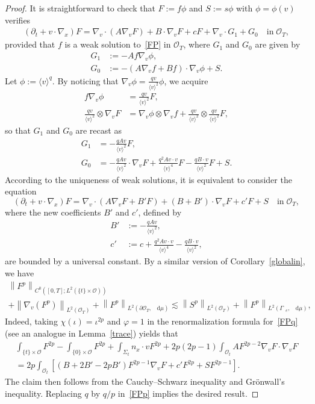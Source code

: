\documentclass[10pt]{amsart}
\theoremstyle{definition}\newtheorem{defi}[theo]{Definition}\newtheorem{rema}[theo]{Remark}\newtheorem{exam}[theo]{Example}\newtheorem{exem}[theo]{Example}\newtheorem{nota}[theo]{Notation}
\newcommand*{\dif}{\mathop{}\!\mathrm{d}}
\newcommand*\p{\partial}
\newcommand*\Ge {\Gamma_{\;\!\!\;\!\!e}}
\newcommand*\OO {\mathcal{O}}
\newcommand{\lv}{\langle v\rangle}
\begin{document}
\begin{proof}
It is straightforward to check that $F:=f\phi$ and $S:=s\phi$ with $\phi=\phi(v)$ verifies
\begin{align*}
\left(\p_t+v\cdot\nabla_x\right)F = \nabla_v\cdot\left(A\nabla_vF\right) +B\cdot\nabla_v F +cF +\nabla_v\cdot G_1 + G_0 \quad\text{in}\;\OO_T,
\end{align*}
provided that $f$ is a weak solution to~\eqref{FP} in $\OO_T$, where $G_1$ and $G_0$ are given by
\begin{align*}
G_1&:= -Af\nabla_v\phi,\\
G_0&:= -\left(A\nabla_vf+Bf\right)\cdot\nabla_v\phi +S.
\end{align*}
Let $\phi:=\lv^q$. By noticing that $\nabla_v\phi=\frac{qv}{\lv^2}\phi$, we acquire
\begin{align*}
f\nabla_v\phi &=\frac{qv}{\lv^2}F,\\
\frac{qv}{\lv^2}\otimes\nabla_vF &=\nabla_v\phi\otimes\nabla_vf+\frac{qv}{\lv^2}\otimes \frac{qv}{\lv^2}F,
\end{align*}
so that $G_1$ and $G_0$ are recast as
\begin{align*}
G_1&=-\frac{qAv}{\lv^2}F,\\
G_0&= -\frac{qAv}{\lv^2}\cdot\nabla_vF +\frac{q^2Av\cdot v}{\lv^4}F -\frac{qB\cdot v}{\lv^2}F +S.
\end{align*}
According to the uniqueness of weak solutions, it is equivalent to consider the equation
\begin{equation}\label{FPq}
\left(\p_t+v\cdot\nabla_x\right)F = \nabla_v\cdot\left(A\nabla_vF+B'F\right) +(B+B')\cdot\nabla_v F +c'F +S \quad\text{in}\;\OO_T,
\end{equation}
where the new coefficients $B'$ and $c'$, defined by
\begin{align*}
B'&:=-\frac{qAv}{\lv^2},\\
c'&:=c+\frac{q^2Av\cdot v}{\lv^4} -\frac{qB\cdot v}{\lv^2},
\end{align*}
are bounded by a universal constant. By a similar version of Corollary~\ref{globalin}, we have
\begin{multline}\label{FPp}
\left\|F^p\right\|_{C^0\left([0,T];L^2(\{t\}\times\OO)\right)} \\
+\left\|\nabla_v\left(F^p\right)\right\|_{L^2(\OO_T)} +\left\|F^p\right\|_{L^{2}\left(\p\OO_T,\;\!\dif\mu\right)} \lesssim \left\|S^p\right\|_{L^{2}(\OO_T)} +\left\|F^p\right\|_{L^{2}\left(\Ge,\;\!\dif\mu\right)} ,
\end{multline}
Indeed, taking $\chi(\iota)=\iota^{2p}$ and $\varphi=1$ in the renormalization formula for~\eqref{FPq} (see an analogue in Lemma~\ref{trace}) yields that
\begin{multline*}
\int_{\{t\}\times\OO}F^{2p} -\int_{\{0\}\times\OO}F^{2p} +\int_{\Sigma_t}n_x\cdot vF^{2p} +2p(2p-1)\int_{\OO_t}AF^{2p-2}\nabla_vF\cdot\nabla_vF \\
= 2p\int_{\OO_t}\left[(B+2B'-2pB')F^{2p-1}\nabla_vF +c'F^{2p} +SF^{2p-1}\right] .
\end{multline*}
The claim then follows from the Cauchy--Schwarz inequality and Gr\"onwall's inequality. Replacing $q$ by $q/p$ in~\eqref{FPp} implies the desired result.
\end{proof}
\end{document}
